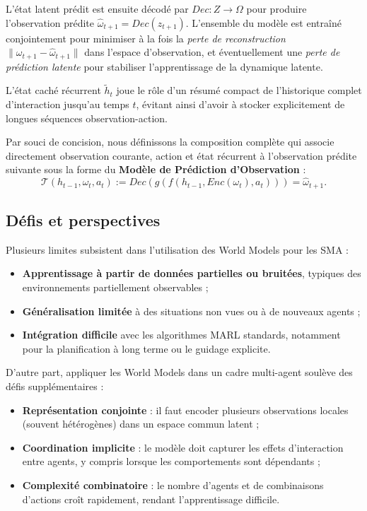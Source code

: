 L'état latent prédit est ensuite décodé par $Dec: Z \rightarrow \Omega$ pour produire l'observation prédite $\hat{\omega}_{t+1} = Dec(z_{t+1})$. L'ensemble du modèle est entraîné conjointement pour minimiser à la fois la \emph{perte de reconstruction} $\|\omega_{t+1} - \hat{\omega}_{t+1}\|$ dans l'espace d'observation, et éventuellement une \emph{perte de prédiction latente} pour stabiliser l'apprentissage de la dynamique latente.

L'état caché récurrent $\tilde{h}_t$ joue le rôle d'un résumé compact de l'historique complet d'interaction jusqu'au temps $t$, évitant ainsi d'avoir à stocker explicitement de longues séquences observation-action.

Par souci de concision, nous définissons la composition complète qui associe directement observation courante, action et état récurrent à l'observation prédite suivante sous la forme du \textbf{Modèle de Prédiction d'Observation} :
\[
    \mathcal{T}(h_{t-1}, \omega_t, a_t) := Dec(g(f(h_{t-1}, Enc(\omega_t), a_t))) = \hat{\omega}_{t+1}.
\]



\subsection{Défis et perspectives}

Plusieurs limites subsistent dans l'utilisation des World Models pour les \ac{SMA} :
\begin{itemize}
    \item \textbf{Apprentissage à partir de données partielles ou bruitées}, typiques des environnements partiellement observables ;
    \item \textbf{Généralisation limitée} à des situations non vues ou à de nouveaux agents ;
    \item \textbf{Intégration difficile} avec les algorithmes \ac{MARL} standards, notamment pour la planification à long terme ou le guidage explicite.
\end{itemize}

D'autre part, appliquer les World Models dans un cadre multi-agent soulève des défis supplémentaires :
\begin{itemize}
    \item \textbf{Représentation conjointe} : il faut encoder plusieurs observations locales (souvent hétérogènes) dans un espace commun latent ;
    \item \textbf{Coordination implicite} : le modèle doit capturer les effets d'interaction entre agents, y compris lorsque les comportements sont dépendants ;
    \item \textbf{Complexité combinatoire} : le nombre d'agents et de combinaisons d'actions croît rapidement, rendant l'apprentissage difficile.
\end{itemize}

